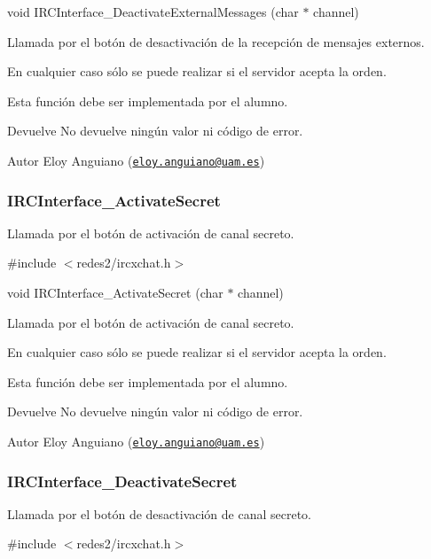 void I\-R\-C\-Interface\-\_\-\-Deactivate\-External\-Messages (char $\ast$ channel)

Llamada por el botón de desactivación de la recepción de mensajes externos.

En cualquier caso sólo se puede realizar si el servidor acepta la orden.

Esta función debe ser implementada por el alumno.

\begin{DoxyReturn}{Devuelve}
No devuelve ningún valor ni código de error.
\end{DoxyReturn}
\begin{DoxyAuthor}{Autor}
Eloy Anguiano (\href{mailto:eloy.anguiano@uam.es}{\tt eloy.\-anguiano@uam.\-es})
\end{DoxyAuthor}


 \hypertarget{IRCInterface_ActivateSecret}{}\subsubsection{I\-R\-C\-Interface\-\_\-\-Activate\-Secret}\label{IRCInterface_ActivateSecret}
Llamada por el botón de activación de canal secreto.

\#include $<$redes2/ircxchat.\-h$>$

void I\-R\-C\-Interface\-\_\-\-Activate\-Secret (char $\ast$ channel)

Llamada por el botón de activación de canal secreto.

En cualquier caso sólo se puede realizar si el servidor acepta la orden.

Esta función debe ser implementada por el alumno.

\begin{DoxyReturn}{Devuelve}
No devuelve ningún valor ni código de error.
\end{DoxyReturn}
\begin{DoxyAuthor}{Autor}
Eloy Anguiano (\href{mailto:eloy.anguiano@uam.es}{\tt eloy.\-anguiano@uam.\-es})
\end{DoxyAuthor}


 \hypertarget{IRCInterface_DeactivateSecret}{}\subsubsection{I\-R\-C\-Interface\-\_\-\-Deactivate\-Secret}\label{IRCInterface_DeactivateSecret}
Llamada por el botón de desactivación de canal secreto.

\#include $<$redes2/ircxchat.\-h$>$

